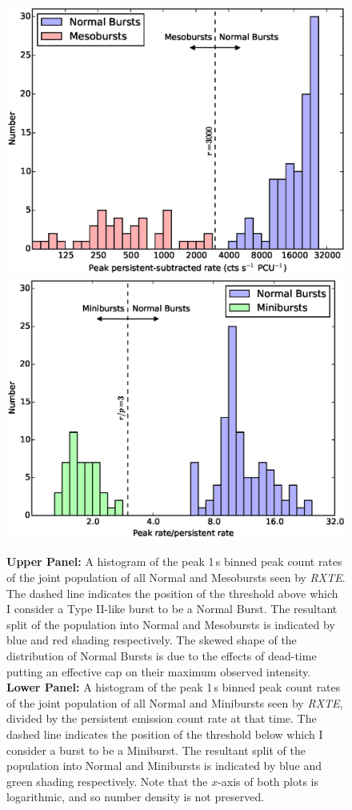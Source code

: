 \begin{figure}
  \centering
  \includegraphics[width=.8\linewidth, trim={1.3cm 0.4cm 2.0cm 0.8cm},clip]{images/norm_meso_sep.eps}
  \includegraphics[width=.8\linewidth, trim={1.3cm 0.4cm 2.0cm 0.8cm},clip]{images/norm_mini_sep.eps}
  \caption[Histogram of the peak 1\,s binned peak count rates during Normal Bursts, Mesobursts and Minibursts as seen by \textit{RXTE}]{\small \textbf{Upper Panel:} A histogram of the peak 1\,s binned peak count rates of the joint population of all Normal and Mesobursts seen by \indexrxte\textit{RXTE}.  The dashed line indicates the position of the threshold above which I consider a Type II-like burst to be a Normal Burst.  The resultant split of the population into Normal and Mesobursts is indicated by blue and red shading respectively.  The skewed shape of the distribution of Normal Bursts is due to the effects of dead-time putting an effective cap on their maximum observed intensity.
 \textbf{Lower Panel:} A histogram of the peak 1\,s binned peak count rates of the joint population of all Normal and Minibursts seen by \textit{RXTE}, divided by the persistent emission count rate at that time.  The dashed line indicates the position of the threshold below which I consider a burst to be a Miniburst.  The resultant split of the population into Normal and Minibursts is indicated by blue and green shading respectively.
  Note that the $x$-axis of both plots is logarithmic, and so number density is not preserved.}
  \label{fig:jointhist}
\end{figure}

